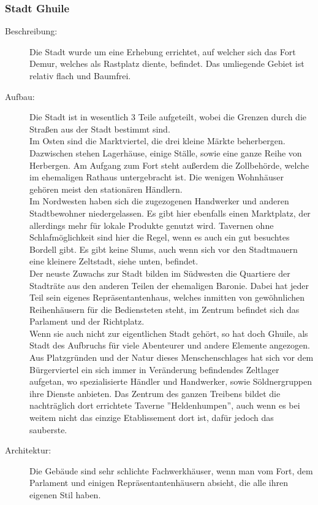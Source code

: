 \documentclass[a4paper,12pt,oneside]{book}
\begin{document}
\subsubsection{Stadt Ghuile}
\begin{description}
\item[Beschreibung:]Die Stadt wurde um eine Erhebung errichtet, auf welcher sich das Fort Demur, welches als Rastplatz diente, befindet. Das umliegende Gebiet ist relativ flach und Baumfrei. 
\item[Aufbau:]Die Stadt ist in wesentlich 3 Teile aufgeteilt, wobei die Grenzen durch die Straßen aus der Stadt bestimmt sind. \\Im Osten sind die Marktviertel, die drei kleine Märkte beherbergen. Dazwischen stehen Lagerhäuse, einige Ställe, sowie eine ganze Reihe von Herbergen. Am Aufgang zum Fort steht außerdem die Zollbehörde, welche im ehemaligen Rathaus untergebracht ist. Die wenigen Wohnhäuser gehören meist den stationären Händlern. 
\\Im Nordwesten haben sich die zugezogenen Handwerker und anderen Stadtbewohner niedergelassen. Es gibt hier ebenfalls einen Marktplatz, der allerdings mehr für lokale Produkte genutzt wird. Tavernen ohne Schlafmöglichkeit sind hier die Regel, wenn es auch ein gut besuchtes Bordell gibt. Es gibt keine Slums, auch wenn sich vor den Stadtmauern eine kleinere Zeltstadt, siehe unten, befindet.
\\Der neuste Zuwachs zur Stadt bilden im Südwesten die Quartiere der Stadträte aus den anderen Teilen der ehemaligen Baronie. Dabei hat jeder Teil sein eigenes Repräsentantenhaus, welches inmitten von gewöhnlichen Reihenhäusern für die Bediensteten steht, im Zentrum befindet sich das Parlament und der Richtplatz.
\\Wenn sie auch nicht zur eigentlichen Stadt gehört, so hat doch Ghuile, als Stadt des Aufbruchs für viele Abenteurer und andere Elemente angezogen. Aus Platzgründen und der Natur dieses Menschenschlages hat sich vor dem Bürgerviertel ein sich immer in Veränderung befindendes Zeltlager aufgetan, wo spezialisierte Händler und Handwerker, sowie Söldnergruppen ihre Dienste anbieten. Das Zentrum des ganzen Treibens bildet die nachträglich dort errichtete Taverne ''Heldenhumpen'', auch wenn es bei weitem nicht das einzige Etablissement dort ist, dafür jedoch das sauberste. 
\item[Architektur:]Die Gebäude sind sehr schlichte Fachwerkhäuser, wenn man vom Fort, dem Parlament und einigen Repräsentantenhäusern absieht, die alle ihren eigenen Stil haben.

\end{description}
\end{document}
